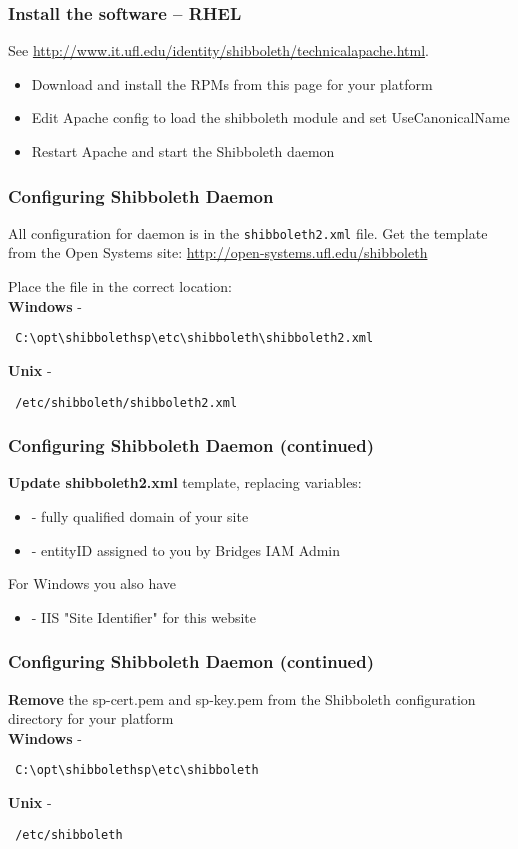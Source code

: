 \begin{frame}
\frametitle{Install the software – RHEL}
{\tiny See \url{http://www.it.ufl.edu/identity/shibboleth/technicalapache.html}.}

\begin{itemize}
\item Download and install the RPMs from this page for your platform
\item Edit Apache config to load the shibboleth module and set UseCanonicalName
\item Restart Apache and start the Shibboleth daemon
\end{itemize}

\end{frame}

\begin{frame}[fragile]
\frametitle{Configuring Shibboleth Daemon}
All configuration for daemon is in the \texttt{shibboleth2.xml} file. Get the template from the Open Systems site:
\url{http://open-systems.ufl.edu/shibboleth}
\bigskip

Place the file in the correct location: \\ \bigskip
\textbf{Windows} - \begin{verbatim} C:\opt\shibbolethsp\etc\shibboleth\shibboleth2.xml \end{verbatim}
\textbf{Unix} - \begin{verbatim} /etc/shibboleth/shibboleth2.xml \end{verbatim}
\end{frame}

\begin{frame}
\frametitle{Configuring Shibboleth Daemon (continued)}
\textbf{Update shibboleth2.xml} template, replacing variables: \\
\begin{itemize}
\item {} - fully qualified domain of your site 
\item {} - entityID assigned to you by Bridges IAM Admin
\end{itemize}
For Windows you also have
\begin{itemize}
\item {} - IIS "Site Identifier" for this website
\end{itemize}
\end{frame}

\begin{frame}[fragile]
\frametitle{Configuring Shibboleth Daemon (continued)}
\textbf{Remove} the sp-cert.pem and sp-key.pem from the Shibboleth configuration directory for your platform \\ \bigskip
\textbf{Windows} - \begin{verbatim} C:\opt\shibbolethsp\etc\shibboleth \end{verbatim}
\textbf{Unix} - \begin{verbatim} /etc/shibboleth \end{verbatim}
\end{frame}

